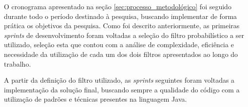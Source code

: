 O cronograma apresentado na seção \ref{sec:processo_metodológico} foi seguido durante todo o período destinado à pesquisa, buscando implementar de forma prática os objetivos da pesquisa.
Como foi descrito anteriormente, as primeiras \textit{sprints} de desenvolvimento foram voltadas a seleção do filtro probabilístico a ser utilizado, seleção esta que contou com a análise de complexidade, eficiência e necessidade da utilização de cada um dos dois filtros apresentados ao longo do trabalho.

A partir da definição do filtro utilizado, as \textit{sprints} seguintes foram voltadas a implementação da solução final,
buscando sempre a qualidade do código com a utilização de padrões e técnicas presentes na linguagem Java.
